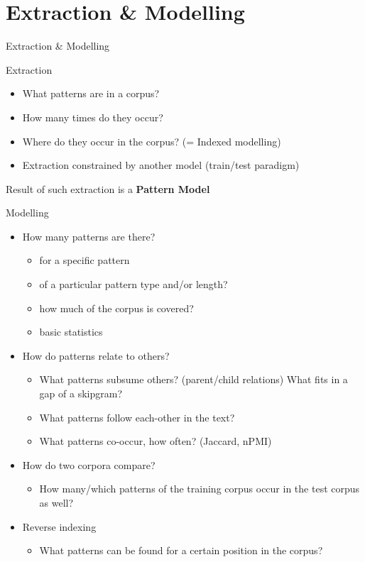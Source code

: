 \documentclass[compress]{beamer}
\begin{document}
\section{Extraction \& Modelling}

\begin{frame}{Extraction \& Modelling}
  \begin{block}{Extraction}
    \begin{itemize}
      \item What patterns are in a corpus? 
      \item How many times do they occur?
      \item Where do they occur in the corpus? (= Indexed modelling)
      \item Extraction constrained by another model (train/test paradigm)
    \end{itemize}
    Result of such extraction is a \textbf{Pattern Model}
  \end{block}
\end{frame}

\begin{frame}
  \begin{block}{Modelling}
    \begin{itemize}
      \item How many patterns are there?
      \begin{itemize}
        \item for a specific pattern
        \item of a particular pattern type and/or length?
        \item how much of the corpus is covered?
        \item basic statistics
      \end{itemize}
      \item How do patterns relate to others?
      \begin{itemize}
        \item What patterns subsume others? (parent/child relations)  What fits
          in a gap of a skipgram?
        \item What patterns follow each-other in the text? 
        \item What patterns co-occur, how often? (Jaccard, nPMI) 
      \end{itemize}
      \item How do two corpora compare?
      \begin{itemize}
        \item How many/which patterns of the training corpus occur in the
          test corpus as well?
      \end{itemize}
      \item Reverse indexing
      \begin{itemize}
          \item What patterns can be found for a certain position in the corpus?
      \end{itemize}
    \end{itemize}
  \end{block}
\end{frame}
\end{document}
